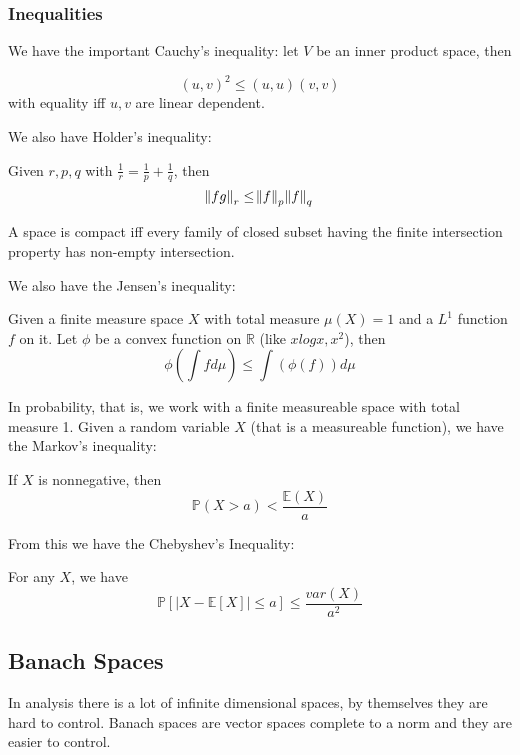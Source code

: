 \documentclass[main.tex]{subfiles}
\begin{document}
\subsubsection{Inequalities}

We have the important Cauchy's inequality:
let $V$ be an inner product space, then 
\begin{theorem}
$$(u,v)^2 \leq (u,u) (v,v)$$
with equality iff $u,v$ are linear dependent.
\end{theorem}

We also have Holder's inequality:

\begin{theorem}
Given $r, p, q$ with $\frac{1}{r} = \frac{1}{p} + \frac{1}{q}$, then 
$$
\norm{fg}_r \leq \norm{f}_{p}  \norm{f}_q
$$

A space is compact iff every family of closed subset having the finite intersection property  has non-empty intersection.

\end{theorem}

We also have the Jensen's inequality:

\begin{theorem}
Given a finite measure space $X$ with total measure $\mu(X) = 1$ and a $L^1$ function $f$ on it. Let $\phi$ be a convex function on $\mathbb{R}$ (like $x log x, x^2$), then 
$$
\phi(\int f d\mu) \leq \int (\phi (f)) d\mu
$$
\end{theorem}

In probability, that is, we work with a finite measureable space with total measure 1. Given a random variable $X$ (that is a measureable function), we have the Markov's inequality:

\begin{theorem}
If $X$ is nonnegative, then 
$$
\mathbb{P}(X > a) < \frac{\mathbb{E}(X)}{a}
$$
\end{theorem}

From this we have the Chebyshev's Inequality:

\begin{theorem}
For any $X$, we have 
$$
\mathbb{P}[|X - \mathbb{E}[X]| \leq a] \leq \frac{var(X)}{a^2}
$$
\end{theorem}






\subsection{Banach Spaces}
In analysis there is a lot of infinite dimensional spaces, by themselves they are hard to control. Banach spaces are vector spaces complete to a norm and they are easier to control. 
\end{document}

